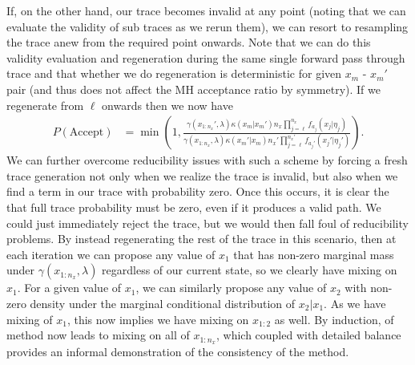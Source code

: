 If, on the other hand, our trace becomes invalid
at any point (noting that we can evaluate the validity of sub traces as we rerun them), we can resort to
resampling the trace anew from the required point onwards.  Note that we can do this validity evaluation
and regeneration during the same single forward pass through trace and that whether we do regeneration
is deterministic for given $x_m$ - $x_m'$ pair (and thus does not affect the MH acceptance ratio by symmetry).
If we regenerate from \sample $\ell$ onwards then we now have
\begin{align}
P(\text{Accept}) &= \min\left(1, \frac{\gamma(x_{1:n_x}',\lambda) \kappa(x_m | x_{m}') n_x \prod_{j=\ell}^{n_x} f_{a_{j}} (x_j | \eta_j)}
{\gamma(x_{1:n_x},\lambda) \kappa(x_m' | x_{m})  n_x' \prod_{j=\ell}^{n_x'} f_{a_{j}'} (x_j' | \eta_j')}\right).
\end{align}
We can further overcome reducibility issues with such a scheme by forcing a fresh trace generation
not only when we realize the trace is invalid, but also when we find a term in our trace with probability zero.
Once this occurs, it is clear the that full trace probability must be zero, even if it produces a valid path.  We
could just immediately reject the trace, but we would then fall foul of reducibility problems.  By instead
regenerating the rest of the trace in this scenario, then at each iteration we can propose any value of $x_1$ that has non-zero marginal
mass under $\gamma(x_{1:n_x},\lambda)$ regardless of our current state, so we clearly have mixing on $x_1$.
For a given value of $x_1$, we can similarly propose any value of $x_2$ with non-zero density under the
marginal conditional distribution of $x_2|x_1$.  As we have mixing of $x_1$, this now implies we have
mixing on $x_{1:2}$ as well.  By induction, of method now leads to mixing on all of $x_{1:n_x}$, which
coupled with detailed balance provides an informal demonstration of the consistency of the method.

